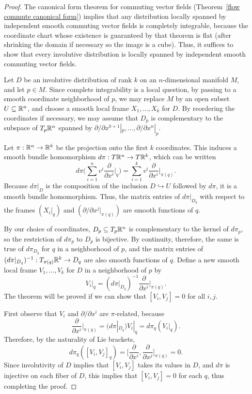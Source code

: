 \begin{proof}
The canonical form theorem for commuting vector fields (Theorem~\ref{flow commute canonical form}) implies that any distribution locally spanned by independent smooth commuting vector fields is completely integrable, because the coordinate chart whose existence is guaranteed by that theorem is flat (after shrinking the domain if necessary so the image is a cube). Thus, it suffices to show that every involutive distribution is locally spanned by independent smooth commuting vector fields.\par
Let $D$ be an involutive distribution of rank $k$ on an $n$-dimensional manifold $M$, and let $p\in M$. Since complete integrability is a local question, by passing to a smooth coordinate neighborhood of $p$, we may replace $M$ by an open subset $U\subseteq\mathbb{R}^n$, and choose a smooth local frame $X_1,\dots,X_k$ for $D$. By reordering the coordinates if necessary, we may assume that $D_p$ is complementary to the subspace of $T_p\mathbb{R}^n$ spanned by $\partial/\partial x^{k+1}|_p,\dots,\partial/\partial x^{n}|_p$.\par 
Let $\pi:\mathbb{R}^n\to\mathbb{R}^k$ be the projection onto the first $k$ coordinates. This induces a smooth bundle homomorphism $d\pi:T\mathbb{R}^n\to T\mathbb{R}^k$, which can be written
\[d\pi\Big(\sum_{i=1}^{n}v^i\frac{\partial}{\partial x^i}\Big|_{q}\Big)=\sum_{i=1}^{k}v^i\frac{\partial}{\partial x^i}\Big|_{\pi(q)}.\]
Because $d\pi|_D$ is the composition of the inclusion $D\hookrightarrow U$ followed by $d\pi$, it is a smooth bundle homomorphism. Thus, the matrix entries of $d\pi|_{D_q}$ with respect to the frames $(X_i|_q)$ and $(\partial/\partial x^j|_{\pi(q)})$ are smooth functions of $q$.\par
By our choice of coordinates, $D_p\subseteq T_p\mathbb{R}^n$ is complementary to the kernel of $d\pi_p$, so the restriction of $d\pi_p$ to $D_p$ is bijective. By continuity, therefore, the same is true of $d\pi_{D_q}$ for $q$ in a neighborhood of $p$, and the matrix entries of $(d\pi|_{D_q})^{-1}:T_{\pi(q)}\mathbb{R}^k\to D_q$ are also smooth functions of $q$. Define a new smooth local frame $V_1,\dots,V_k$ for $D$ in a neighborhood of $p$ by 
\[V_i|_q=(d\pi|_{D_q})^{-1}\frac{\partial}{\partial x^i}\Big|_{\pi(q)}.\]
The theorem will be proved if we can show that $[V_i,V_j]=0$ for all $i,j$.\par
First observe that $V_i$ and $\partial/\partial x^i$ are $\pi$-related, because
\[\frac{\partial}{\partial x^i}\Big|_{\pi(q)}=(d\pi|_{D_q})V_i|_q=d\pi_q(V_i|_q).\]
Therefore, by the naturality of Lie brackets,
\[d\pi_q([V_i,V_j]_q)=\Big[\frac{\partial}{\partial x^i},\frac{\partial}{\partial x^j}\Big]_{\pi(q)}=0.\]
Since involutivity of $D$ implies that $[V_i,V_j]$ takes its values in $D$, and $d\pi$ is injective on each fiber of $D$, this implies that $[V_i,V_j]=0$ for each $q$, thus completing the proof.
\end{proof}
